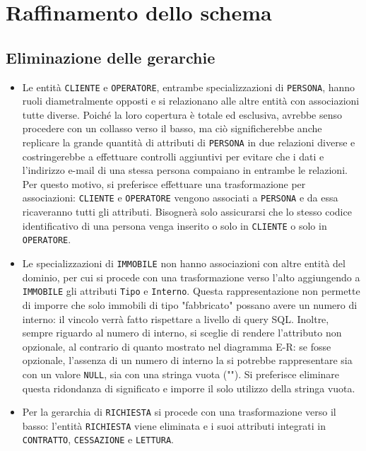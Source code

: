 \documentclass[a4paper,12pt]{report}
\begin{document}
\section{Raffinamento dello schema}
\subsection{Eliminazione delle gerarchie}
\begin{itemize}
    \item Le entità \texttt{CLIENTE} e \texttt{OPERATORE}, entrambe specializzazioni di \texttt{PERSONA}, hanno ruoli diametralmente opposti e si relazionano alle altre entità con associazioni tutte diverse. Poiché la loro copertura è totale ed esclusiva, avrebbe senso procedere con un collasso verso il basso, ma ciò significherebbe anche replicare la grande quantità di attributi di \texttt{PERSONA} in due relazioni diverse e costringerebbe a effettuare controlli aggiuntivi per evitare che i dati e l'indirizzo e-mail di una stessa persona compaiano in entrambe le relazioni. Per questo motivo, si preferisce effettuare una trasformazione per associazioni: \texttt{CLIENTE} e \texttt{OPERATORE} vengono associati a \texttt{PERSONA} e da essa ricaveranno tutti gli attributi. Bisognerà solo assicurarsi che lo stesso codice identificativo di una persona venga inserito o solo in \texttt{CLIENTE} o solo in \texttt{OPERATORE}.
    \item Le specializzazioni di \texttt{IMMOBILE} non hanno associazioni con altre entità del dominio, per cui si procede con una trasformazione verso l'alto aggiungendo a \texttt{IMMOBILE} gli attributi \texttt{Tipo} e \texttt{Interno}. Questa rappresentazione non permette di imporre che solo immobili di tipo "fabbricato" possano avere un numero di interno: il vincolo verrà fatto rispettare a livello di query SQL.
    \newline Inoltre, sempre riguardo al numero di interno, si sceglie di rendere l'attributo non opzionale, al contrario di quanto mostrato nel diagramma E-R: se fosse opzionale, l'assenza di un numero di interno la si potrebbe rappresentare sia con un valore \texttt{NULL}, sia con una stringa vuota (""). Si preferisce eliminare questa ridondanza di significato e imporre il solo utilizzo della stringa vuota.
    \item Per la gerarchia di \texttt{RICHIESTA} si procede con una trasformazione verso il basso: l'entità \texttt{RICHIESTA} viene eliminata e i suoi attributi integrati in \texttt{CONTRATTO}, \texttt{CESSAZIONE} e \texttt{LETTURA}.
\end{itemize}
\end{document}
